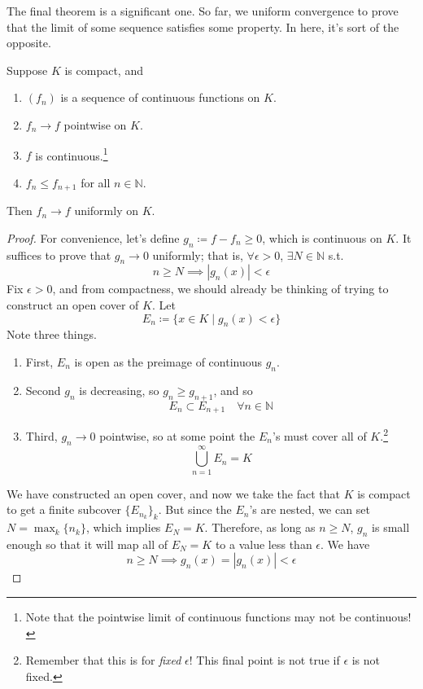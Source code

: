   The final theorem is a significant one. So far, we uniform convergence to prove that the limit of some sequence satisfies some property. In here, it's sort of the opposite. 

  \begin{theorem}
    \label{thm:dini}
    Suppose $K$ is compact, and 
    \begin{enumerate}
      \item $(f_n)$ is a sequence of continuous functions on $K$. 
      \item $f_n \to f$ pointwise on $K$. 
      \item $f$ is continuous.\footnote{Note that the pointwise limit of continuous functions may not be continuous!}
      \item $f_n \leq f_{n+1}$ for all $n \in \mathbb{N}$. 
    \end{enumerate}
    Then $f_n \to f$ uniformly on $K$. 
  \end{theorem} 
  \begin{proof}
    For convenience, let's define $g_n \coloneqq f - f_n \geq 0$, which is continuous on $K$. It suffices to prove that $g_n \to 0$ uniformly; that is, $\forall \epsilon > 0$, $\exists N \in \mathbb{N}$ s.t. 
    \begin{equation}
      n \geq N \implies |g_n (x)| < \epsilon
    \end{equation}
    Fix $\epsilon > 0$, and from compactness, we should already be thinking of trying to construct an open cover of $K$. Let 
    \begin{equation}
      E_n \coloneqq \{ x \in K \mid g_n (x) < \epsilon \}
    \end{equation}
    Note three things. 
    \begin{enumerate}
      \item First, $E_n$ is open as the preimage of continuous $g_n$. 
      \item Second $g_n$ is decreasing, so $g_n \geq g_{n+1}$, and so 
      \begin{equation}
        E_n \subset E_{n+1} \quad \forall n \in \mathbb{N}
      \end{equation}
      \item Third, $g_n \to 0$ pointwise, so at some point the $E_n$'s must cover all of $K$.\footnote{Remember that this is for \textit{fixed} $\epsilon$! This final point is not true if $\epsilon$ is not fixed.} 
      \begin{equation}
        \bigcup_{n = 1}^{\infty} E_n = K
      \end{equation}
    \end{enumerate}
    We have constructed an open cover, and now we take the fact that $K$ is compact to get a finite subcover $\{E_{n_k}\}_{k}$. But since the $E_n$'s are nested, we can set $N = \max_k \{n_k\}$, which implies $E_N = K$. Therefore, as long as $n \geq N$, $g_n$ is small enough so that it will map all of $E_N = K$ to a value less than $\epsilon$. We have 
    \begin{equation}
      n \geq N \implies g_n (x) = |g_n (x)| < \epsilon
    \end{equation}
  \end{proof}

